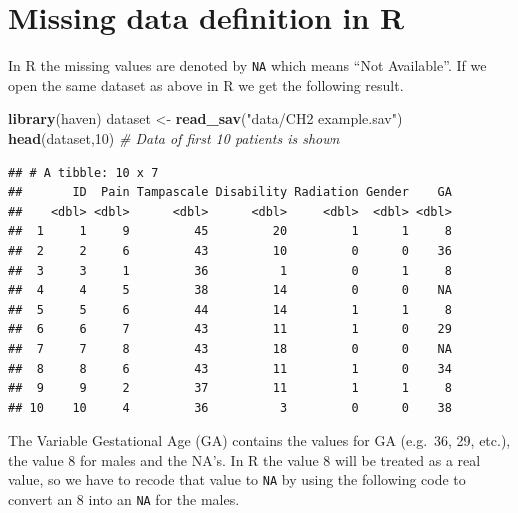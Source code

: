 \documentclass[
]{book}
\newenvironment{Shaded}{\begin{snugshade}}{\end{snugshade}}
\newcommand{\CommentTok}[1]{\textcolor[rgb]{0.56,0.35,0.01}{\textit{#1}}}
\newcommand{\DecValTok}[1]{\textcolor[rgb]{0.00,0.00,0.81}{#1}}
\newcommand{\KeywordTok}[1]{\textcolor[rgb]{0.13,0.29,0.53}{\textbf{#1}}}
\newcommand{\NormalTok}[1]{#1}
\newcommand{\OperatorTok}[1]{\textcolor[rgb]{0.81,0.36,0.00}{\textbf{#1}}}
\newcommand{\OtherTok}[1]{\textcolor[rgb]{0.56,0.35,0.01}{#1}}
\newcommand{\StringTok}[1]{\textcolor[rgb]{0.31,0.60,0.02}{#1}}
\begin{document}
\hypertarget{missing-data-definition-in-r}{%
\section{Missing data definition in R}\label{missing-data-definition-in-r}}

In R the missing values are denoted by \texttt{NA} which means ``Not Available''. If we open the same dataset as above in R we get the following result.

\begin{Shaded}
\begin{Highlighting}[]
\KeywordTok{library}\NormalTok{(haven)}
\NormalTok{dataset <-}\StringTok{ }\KeywordTok{read_sav}\NormalTok{(}\StringTok{"data/CH2 example.sav"}\NormalTok{)}
\KeywordTok{head}\NormalTok{(dataset,}\DecValTok{10}\NormalTok{) }\CommentTok{# Data of first 10 patients is shown}
\end{Highlighting}
\end{Shaded}

\begin{verbatim}
## # A tibble: 10 x 7
##       ID  Pain Tampascale Disability Radiation Gender    GA
##    <dbl> <dbl>      <dbl>      <dbl>     <dbl>  <dbl> <dbl>
##  1     1     9         45         20         1      1     8
##  2     2     6         43         10         0      0    36
##  3     3     1         36          1         0      1     8
##  4     4     5         38         14         0      0    NA
##  5     5     6         44         14         1      1     8
##  6     6     7         43         11         1      0    29
##  7     7     8         43         18         0      0    NA
##  8     8     6         43         11         1      0    34
##  9     9     2         37         11         1      1     8
## 10    10     4         36          3         0      0    38
\end{verbatim}

The Variable Gestational Age (GA) contains the values for GA (e.g.~36, 29, etc.), the value 8 for males and the NA's. In R the value 8 will be treated as a real value, so we have to recode that value to \texttt{NA} by using the following code to convert an 8 into an \texttt{NA} for the males.

\begin{Shaded}
\end{Shaded}
\end{document}
